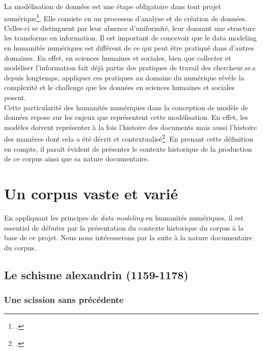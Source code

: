 La modélisation de données est une étape obligatoire dans tout projet numérique\footcite{simsion_data_2005}. Elle consiste en un processus d’analyse et de création de données. Celles-ci se distinguent par leur absence d’uniformité, leur donnant une structure les transforme en information. Il est important de concevoir que le data modeling en humanités numériques est différent de ce qui peut être pratiqué dans d’autres domaines. En effet, en sciences humaines et sociales, bien que collecter et modéliser l’information fait déjà partie des pratiques de travail des chercheur.se.s depuis longtemps, appliquer ces pratiques au domaine du numérique révèle la complexité et le challenge que les données en sciences humaines et sociales posent.\\
Cette particularité des humanités numériques dans la conception de modèle de données repose sur les enjeux que représentent cette modélisation. En effet, les modèles doivent représenter à la fois l’histoire des documents mais aussi l’histoire des manières dont cela a été décrit et contextualisé\footcite{flanders_shape_2018}. En prenant cette définition en compte, il paraît évident de présenter le contexte historique de la production de ce corpus ainsi que sa nature documentaire. 
 
 
 \chapter{Un corpus vaste et varié}

En appliquant les principes de \textit{data modeling} en humanités numériques, il est essentiel de débuter par la présentation du contexte historique du corpus à la base de ce projet. Nous nous intéresserons par la suite à la nature documentaire du corpus.

    \section{Le schisme alexandrin (1159-1178)}
    
    \subsection{Une scission sans précédente}

